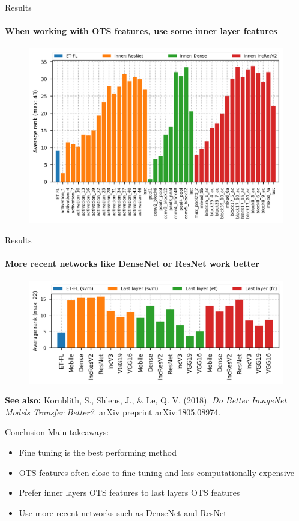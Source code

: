 \documentclass{beamer}
\begin{document}
\begin{frame}{Results}
\framesubtitle{When working with OTS features, use some inner layer features}
	\vfill	
	\begin{figure}
		\center
		\includegraphics[scale=0.7]{images/all_per_layer_hori_bars.png}
	\end{figure}
	\vfill
\end{frame}


\begin{frame}{Results}
\framesubtitle{More recent networks like DenseNet or ResNet work better}
\begin{figure}
	\center
	\includegraphics[scale=0.65]{images/last_baseline_bars.png}
\end{figure}

{\footnotesize
	\textbf{See also:} Kornblith, S., Shlens, J., \& Le, Q. V. (2018). \textit{Do Better ImageNet Models Transfer Better?}. arXiv preprint arXiv:1805.08974.
} 
\end{frame}

\begin{frame}{Conclusion}
	\vfill
	Main {takeaways}:
	\vfill
	\begin{itemize}
		\item {Fine tuning} is the best performing method
		\item {OTS features} often close to fine-tuning and less computationally expensive
		\item Prefer {inner layers OTS features} to last layers OTS features
		\item Use {more recent networks} such as DenseNet and ResNet
	\end{itemize}
	\vfill
	
\end{frame}
\end{document}
